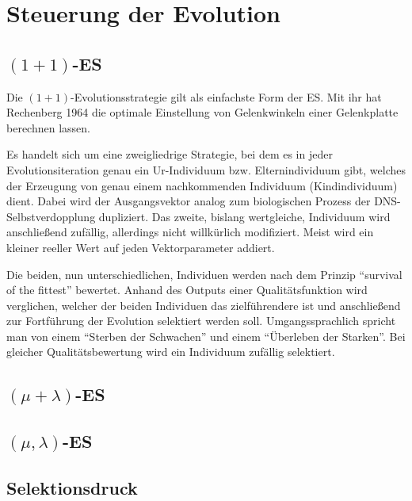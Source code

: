 
\section{Steuerung der Evolution}

\subsection{$(1+1)$-ES}

Die $(1+1)$-Evolutionsstrategie gilt als einfachste Form der ES. Mit ihr hat Rechenberg 1964 die optimale Einstellung von Gelenkwinkeln einer Gelenkplatte berechnen lassen.

Es handelt sich um eine zweigliedrige Strategie, bei dem es in jeder Evolutionsiteration genau ein Ur-Individuum bzw. Elternindividuum gibt, welches der Erzeugung von genau einem nachkommenden Individuum (Kindindividuum) dient. Dabei wird der Ausgangsvektor analog zum biologischen Prozess der DNS-Selbstverdopplung dupliziert. Das zweite, bislang wertgleiche, Individuum wird anschließend zufällig, allerdings nicht willkürlich modifiziert. Meist wird ein kleiner reeller Wert auf jeden Vektorparameter addiert.

Die beiden, nun unterschiedlichen, Individuen werden nach dem Prinzip \enquote{survival of the fittest} bewertet.
Anhand des Outputs einer Qualitätsfunktion wird verglichen, welcher der beiden Individuen das zielführendere ist und anschließend zur Fortführung der Evolution selektiert werden soll.
Umgangssprachlich spricht man von einem \enquote{Sterben der Schwachen} und einem \enquote{Überleben der Starken}.
Bei gleicher Qualitätsbewertung wird ein Individuum zufällig selektiert.

\subsection{$(\mu + \lambda)$-ES}



\subsection{$(\mu, \lambda)$-ES}



\subsection{Selektionsdruck}



